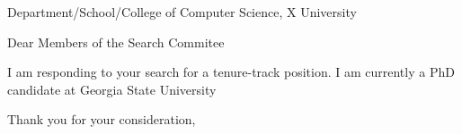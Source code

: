 \documentclass[12pt,a4paper]{letter}
\date{}
\begin{document}
 
\begin{letter}{Department/School/College of Computer Science, X University} 
\opening{Dear Members of the Search Commitee} 
 
I am responding to your search for a tenure-track position.
I am currently a PhD candidate at Georgia State University



\closing{Thank you for your consideration,} 
\end{letter} 
\end{document}
